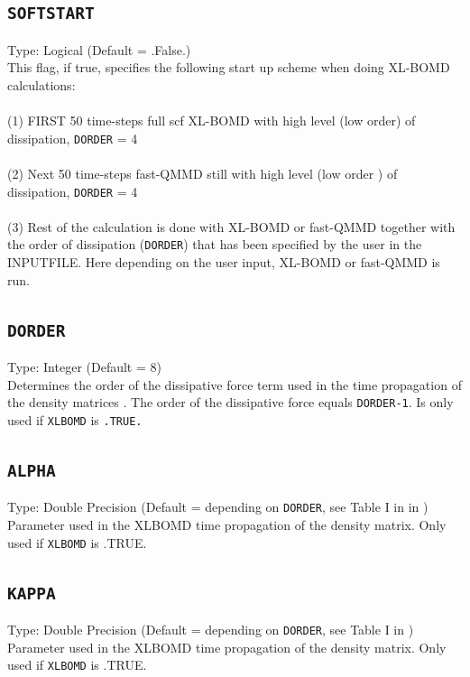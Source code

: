 \documentclass[a4paper,twoside,openany]{book}
\begin{document}
 \subsection{\texttt{SOFTSTART}}
 Type: Logical (Default = .False.)\\
 This flag, if true, specifies the following start up scheme when doing XL-BOMD calculations:\\ \\
(1) FIRST 50 time-steps full scf XL-BOMD with high level (low order) of \\
dissipation, \texttt{DORDER} = 4\\ \\
(2) Next 50 time-steps fast-QMMD still with high level (low order ) of
\\dissipation, \texttt{DORDER} = 4\\ \\
(3) Rest of the calculation is done with XL-BOMD or fast-QMMD together with the 
order of dissipation (\texttt{DORDER}) that has been specified by the user in the INPUTFILE. Here depending on the user input, XL-BOMD or fast-QMMD
is run.


 \subsection{\texttt{DORDER}}
 Type: Integer (Default = 8)\\
 Determines the order of the dissipative force term used in the time propagation of the density matrices \cite{XLBOMD}. The order of the dissipative force equals \texttt{DORDER-1}.
 Is only used if \texttt{XLBOMD} is \texttt{.TRUE.}
 
 \subsection{\texttt{ALPHA}}
 Type: Double Precision (Default = depending on \texttt{DORDER}, see Table I in in \cite{XLBOMD} )\\
 Parameter used in the XLBOMD time propagation of the density matrix. Only used if \texttt{XLBOMD}  is .TRUE.
 
  \subsection{\texttt{KAPPA}}
 Type: Double Precision (Default = depending on \texttt{DORDER}, see Table I in \cite{XLBOMD} )\\
 Parameter used in the XLBOMD time propagation of the density matrix. Only used if \texttt{XLBOMD}  is .TRUE.
 
\end{document}
